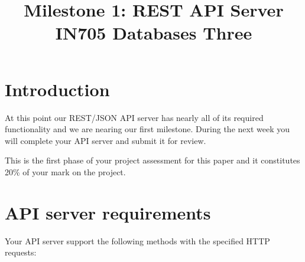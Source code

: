 \documentclass{article}
\begin{document}
\title{Milestone 1: REST API Server\\ IN705 Databases Three}
\date{}
\maketitle

\section*{Introduction}
At this point our REST/JSON API server has nearly all of its required functionality and we are nearing our first milestone.  During the next week you will complete your API server and submit it for review.  

This is the first phase of your project assessment for this paper and it constitutes 20\% of your mark on the project.

\section{API server requirements}
Your API server support the following methods with the specified HTTP requests:
\end{document}
